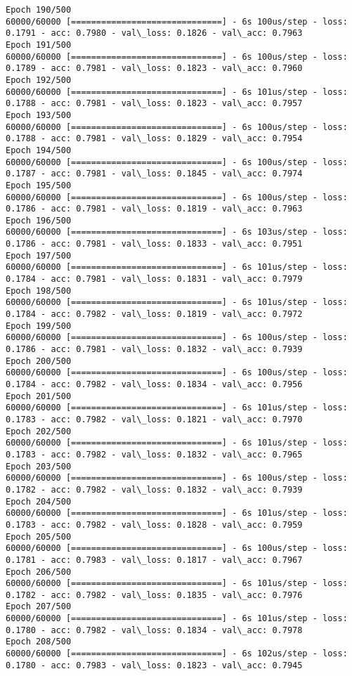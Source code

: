 \documentclass[11pt]{article}
\begin{document}
\begin{Verbatim}[commandchars=\\\{\}]
Epoch 190/500
60000/60000 [==============================] - 6s 100us/step - loss: 0.1791 - acc: 0.7980 - val\_loss: 0.1826 - val\_acc: 0.7963
Epoch 191/500
60000/60000 [==============================] - 6s 100us/step - loss: 0.1789 - acc: 0.7981 - val\_loss: 0.1823 - val\_acc: 0.7960
Epoch 192/500
60000/60000 [==============================] - 6s 101us/step - loss: 0.1788 - acc: 0.7981 - val\_loss: 0.1823 - val\_acc: 0.7957
Epoch 193/500
60000/60000 [==============================] - 6s 100us/step - loss: 0.1788 - acc: 0.7981 - val\_loss: 0.1829 - val\_acc: 0.7954
Epoch 194/500
60000/60000 [==============================] - 6s 100us/step - loss: 0.1787 - acc: 0.7981 - val\_loss: 0.1845 - val\_acc: 0.7974
Epoch 195/500
60000/60000 [==============================] - 6s 100us/step - loss: 0.1786 - acc: 0.7981 - val\_loss: 0.1819 - val\_acc: 0.7963
Epoch 196/500
60000/60000 [==============================] - 6s 103us/step - loss: 0.1786 - acc: 0.7981 - val\_loss: 0.1833 - val\_acc: 0.7951
Epoch 197/500
60000/60000 [==============================] - 6s 101us/step - loss: 0.1784 - acc: 0.7981 - val\_loss: 0.1831 - val\_acc: 0.7979
Epoch 198/500
60000/60000 [==============================] - 6s 101us/step - loss: 0.1784 - acc: 0.7982 - val\_loss: 0.1819 - val\_acc: 0.7972
Epoch 199/500
60000/60000 [==============================] - 6s 100us/step - loss: 0.1786 - acc: 0.7981 - val\_loss: 0.1832 - val\_acc: 0.7939
Epoch 200/500
60000/60000 [==============================] - 6s 100us/step - loss: 0.1784 - acc: 0.7982 - val\_loss: 0.1834 - val\_acc: 0.7956
Epoch 201/500
60000/60000 [==============================] - 6s 101us/step - loss: 0.1783 - acc: 0.7982 - val\_loss: 0.1821 - val\_acc: 0.7970
Epoch 202/500
60000/60000 [==============================] - 6s 101us/step - loss: 0.1783 - acc: 0.7982 - val\_loss: 0.1832 - val\_acc: 0.7965
Epoch 203/500
60000/60000 [==============================] - 6s 100us/step - loss: 0.1782 - acc: 0.7982 - val\_loss: 0.1832 - val\_acc: 0.7939
Epoch 204/500
60000/60000 [==============================] - 6s 101us/step - loss: 0.1783 - acc: 0.7982 - val\_loss: 0.1828 - val\_acc: 0.7959
Epoch 205/500
60000/60000 [==============================] - 6s 100us/step - loss: 0.1781 - acc: 0.7983 - val\_loss: 0.1817 - val\_acc: 0.7967
Epoch 206/500
60000/60000 [==============================] - 6s 101us/step - loss: 0.1782 - acc: 0.7982 - val\_loss: 0.1835 - val\_acc: 0.7976
Epoch 207/500
60000/60000 [==============================] - 6s 101us/step - loss: 0.1780 - acc: 0.7982 - val\_loss: 0.1834 - val\_acc: 0.7978
Epoch 208/500
60000/60000 [==============================] - 6s 102us/step - loss: 0.1780 - acc: 0.7983 - val\_loss: 0.1823 - val\_acc: 0.7945

\end{Verbatim}
\end{document}
